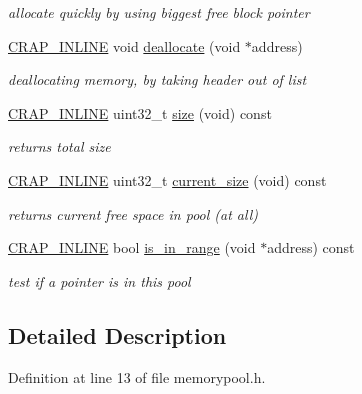 \begin{DoxyCompactItemize}
\begin{DoxyCompactList}\small\item\em allocate quickly by using biggest free block pointer \end{DoxyCompactList}\item 
\hyperlink{config__x86_8h_a5a40526b8d842e7ff731509998bb0f1c}{C\+R\+A\+P\+\_\+\+I\+N\+L\+I\+N\+E} void \hyperlink{classcrap_1_1memory__pool_a9535c7027e4bbd89bb763ab461080ac1}{deallocate} (void $\ast$address)
\begin{DoxyCompactList}\small\item\em deallocating memory, by taking header out of list \end{DoxyCompactList}\item 
\hyperlink{config__x86_8h_a5a40526b8d842e7ff731509998bb0f1c}{C\+R\+A\+P\+\_\+\+I\+N\+L\+I\+N\+E} uint32\+\_\+t \hyperlink{classcrap_1_1memory__pool_a2f3e04e4e27dcdef3ded60f2ee7ee939}{size} (void) const 
\begin{DoxyCompactList}\small\item\em returns total size \end{DoxyCompactList}\item 
\hyperlink{config__x86_8h_a5a40526b8d842e7ff731509998bb0f1c}{C\+R\+A\+P\+\_\+\+I\+N\+L\+I\+N\+E} uint32\+\_\+t \hyperlink{classcrap_1_1memory__pool_af040347c41a0e1099a23812c0b53dca4}{current\+\_\+size} (void) const 
\begin{DoxyCompactList}\small\item\em returns current free space in pool (at all) \end{DoxyCompactList}\item 
\hyperlink{config__x86_8h_a5a40526b8d842e7ff731509998bb0f1c}{C\+R\+A\+P\+\_\+\+I\+N\+L\+I\+N\+E} bool \hyperlink{classcrap_1_1memory__pool_ad01cbb03dc6aaed343e2160221a1266b}{is\+\_\+in\+\_\+range} (void $\ast$address) const 
\begin{DoxyCompactList}\small\item\em test if a pointer is in this pool \end{DoxyCompactList}\end{DoxyCompactItemize}


\subsection{Detailed Description}


Definition at line 13 of file memorypool.\+h.



